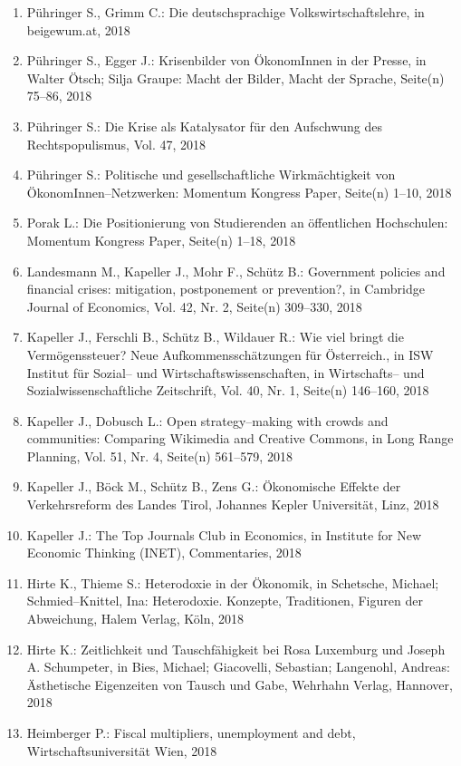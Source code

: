 \begin{enumerate}
	 \item Pühringer S., Grimm C.: Die deutschsprachige Volkswirtschaftslehre, in beigewum.at, 2018
	 \item Pühringer S., Egger J.: Krisenbilder von ÖkonomInnen in der Presse, in Walter Ötsch; Silja Graupe: Macht der Bilder, Macht der Sprache, Seite(n) 75--86, 2018
	 \item Pühringer S.: Die Krise als Katalysator für den Aufschwung des Rechtspopulismus, Vol. 47, 2018
	 \item Pühringer S.: Politische und gesellschaftliche Wirkmächtigkeit von ÖkonomInnen--Netzwerken: Momentum Kongress Paper, Seite(n) 1--10, 2018
	 \item Porak L.: Die Positionierung von Studierenden an öffentlichen Hochschulen: Momentum Kongress Paper, Seite(n) 1--18, 2018
	 \item Landesmann M., Kapeller J., Mohr F., Schütz B.: Government policies and financial crises: mitigation, postponement or prevention?, in Cambridge Journal of Economics, Vol. 42, Nr. 2, Seite(n) 309--330, 2018
	 \item Kapeller J., Ferschli B., Schütz B., Wildauer R.: Wie viel bringt die Vermögenssteuer? Neue Aufkommensschätzungen für Österreich., in ISW Institut für Sozial-- und Wirtschaftswissenschaften, in Wirtschafts-- und Sozialwissenschaftliche Zeitschrift, Vol. 40, Nr. 1, Seite(n) 146--160, 2018
	 \item Kapeller J., Dobusch L.: Open strategy--making with crowds and communities: Comparing Wikimedia and Creative Commons, in Long Range Planning, Vol. 51, Nr. 4, Seite(n) 561--579, 2018
	 \item Kapeller J., Böck M., Schütz B., Zens G.: Ökonomische Effekte der Verkehrsreform des Landes Tirol, Johannes Kepler Universität, Linz, 2018
	 \item Kapeller J.: The Top Journals Club in Economics, in Institute for New Economic Thinking (INET), Commentaries, 2018
	 \item Hirte K., Thieme S.: Heterodoxie in der Ökonomik, in Schetsche, Michael; Schmied--Knittel, Ina: Heterodoxie. Konzepte, Traditionen, Figuren der Abweichung, Halem Verlag, Köln, 2018
	 \item Hirte K.: Zeitlichkeit und Tauschfähigkeit bei Rosa Luxemburg und Joseph A. Schumpeter, in Bies, Michael; Giacovelli, Sebastian; Langenohl, Andreas: Ästhetische Eigenzeiten von Tausch und Gabe, Wehrhahn Verlag, Hannover, 2018
	 \item Heimberger P.: Fiscal multipliers, unemployment and debt, Wirtschaftsuniversität Wien, 2018

\end{enumerate}
